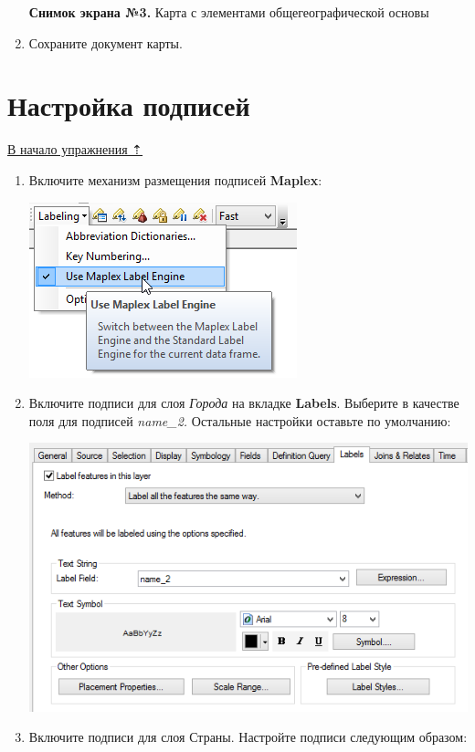 \documentclass[12pt,]{book}
\begin{document}
\begin{enumerate}
  \textbf{Снимок экрана №3.} Карта с элементами общегеографической основы
\item
  Сохраните документ карты.
\end{enumerate}

\hypertarget{map-design-economic-labels}{%
\section{Настройка подписей}\label{map-design-economic-labels}}

\protect\hyperlink{map-design-economic}{В начало упражнения ⇡}

\begin{enumerate}
\def\labelenumi{\arabic{enumi}.}
\item
  Включите механизм размещения подписей \textbf{Maplex}:

  \includegraphics{images/Ex04/image26.png}
\item
  Включите подписи для слоя \emph{Города} на вкладке \textbf{Labels}. Выберите в качестве поля для подписей \emph{name\_2.} Остальные настройки оставьте по умолчанию:

  \includegraphics{images/Ex04/image27.png}
\item
  Включите подписи для слоя Страны. Настройте подписи следующим образом:


\end{enumerate}
\end{document}

